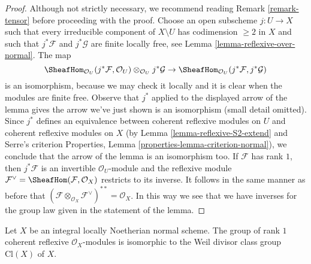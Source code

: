 \begin{proof}
Although not strictly necessary, we recommend reading
Remark \ref{remark-tensor} before proceeding with the proof.
Choose an open subscheme $j : U \to X$ such that
every irreducible component of $X \setminus U$ has codimension $\geq 2$
in $X$ and such that $j^*\mathcal{F}$ and $j^*\mathcal{G}$ are finite
locally free, see Lemma \ref{lemma-reflexive-over-normal}.
The map
$$
\SheafHom_{\mathcal{O}_U}(j^*\mathcal{F}, \mathcal{O}_U)
\otimes_{\mathcal{O}_U} j^*\mathcal{G} \to
\SheafHom_{\mathcal{O}_U}(j^*\mathcal{F}, j^*\mathcal{G})
$$
is an isomorphism, because we may check it locally and it is
clear when the modules are finite free. Observe that $j^*$
applied to the displayed arrow of the lemma gives the arrow
we've just shown is an isomorphism (small detail omitted).
Since $j^*$ defines an equivalence between coherent reflexive modules on $U$
and coherent reflexive modules on $X$
(by Lemma \ref{lemma-reflexive-S2-extend} and Serre's criterion
Properties, Lemma \ref{properties-lemma-criterion-normal}),
we conclude that the arrow of the lemma is an isomorphism too.
If $\mathcal{F}$ has rank $1$, then $j^*\mathcal{F}$
is an invertible $\mathcal{O}_U$-module and the reflexive module
$\mathcal{F}^\vee = \SheafHom(\mathcal{F}, \mathcal{O}_X)$
restricts to its inverse. It follows in the same manner as before that
$(\mathcal{F} \otimes_{\mathcal{O}_X} \mathcal{F}^\vee)^{**} = \mathcal{O}_X$.
In this way we see that we have inverses for the group law
given in the statement of the lemma.
\end{proof}

\begin{lemma}
\label{lemma-normal-class-group}
Let $X$ be an integral locally Noetherian normal scheme.
The group of rank $1$ coherent reflexive $\mathcal{O}_X$-modules
is isomorphic to the Weil divisor class group $\text{Cl}(X)$ of $X$.
\end{lemma}

